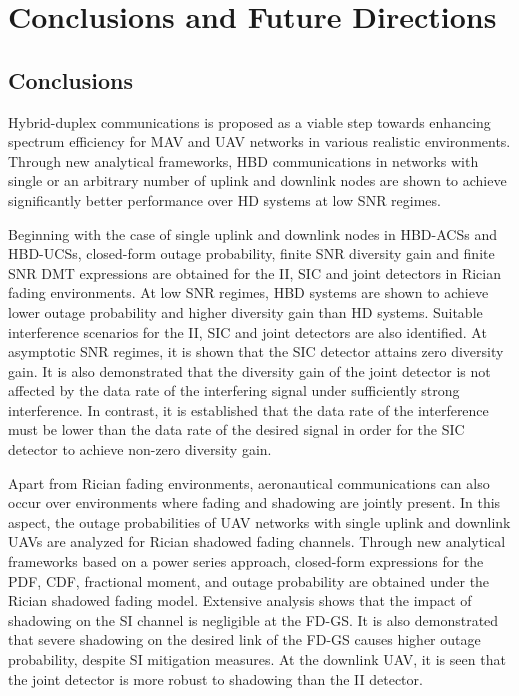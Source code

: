 \chapter{Conclusions and Future Directions}
\label{chap:conclu}
\section{Conclusions}
Hybrid-duplex communications is proposed as a viable step towards enhancing spectrum efficiency for MAV and UAV networks in various realistic environments. Through new analytical frameworks, HBD communications in networks with single or an arbitrary number of uplink and downlink nodes are shown to achieve significantly better performance over HD systems at low SNR regimes.

Beginning with the case of single uplink and downlink nodes in HBD-ACSs and HBD-UCSs, closed-form outage probability, finite SNR diversity gain and finite SNR DMT expressions are obtained for the II, SIC and joint detectors in Rician fading environments. At low SNR regimes, HBD systems are shown to achieve lower outage probability and higher diversity gain than HD systems. Suitable interference scenarios for the II, SIC and joint detectors are also identified. At asymptotic SNR regimes, it is shown that the SIC detector attains zero diversity gain. It is also demonstrated that the diversity gain of the joint detector is not affected by the data rate of the interfering signal under sufficiently strong interference. In contrast, it is established that the data rate of the interference must be lower than the data rate of the desired signal in order for the SIC detector to achieve non-zero diversity gain.

Apart from Rician fading environments, aeronautical communications can also occur over environments where fading and shadowing are jointly present. In this aspect, the outage probabilities of UAV networks with single uplink and downlink UAVs are analyzed for Rician shadowed fading channels. Through new analytical frameworks based on a power series approach, closed-form expressions for the PDF, CDF, fractional moment, and outage probability are obtained under the Rician shadowed fading model. Extensive analysis shows that the impact of shadowing on the SI channel is negligible at the FD-GS. It is also demonstrated that severe shadowing on the desired link of the FD-GS causes higher outage probability, despite SI mitigation measures. At the downlink UAV, it is seen that the joint detector is more robust to shadowing than the II detector.

